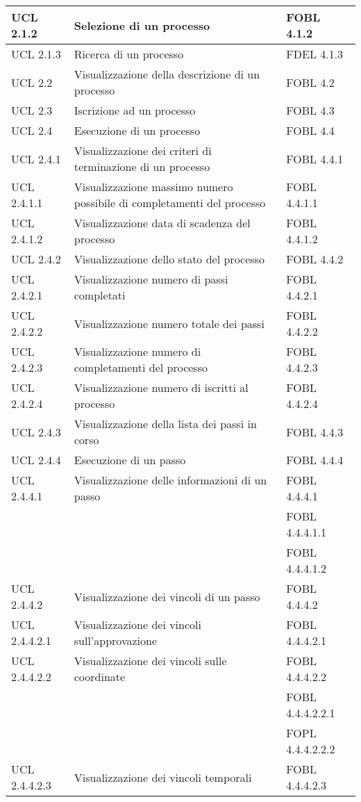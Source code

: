 \begin{longtable}{lXp{}}
\midrule 
UCL 2.1.2&Selezione di un processo&FOBL 4.1.2\\ 
\midrule 
UCL 2.1.3&Ricerca di un processo&FDEL 4.1.3\\ 
\midrule 
UCL 2.2&Visualizzazione della descrizione di un processo&FOBL 4.2\\ 
\midrule 
UCL 2.3&Iscrizione ad un processo&FOBL 4.3\\ 
\midrule 
UCL 2.4&Esecuzione di un processo&FOBL 4.4\\ 
\midrule 
UCL 2.4.1&Visualizzazione dei criteri di terminazione di un processo&FOBL 4.4.1\\
\midrule
UCL 2.4.1.1&Visualizzazione massimo numero possibile di completamenti del processo&FOBL 4.4.1.1\\ 
\midrule 
UCL 2.4.1.2&Visualizzazione data di scadenza del processo&FOBL 4.4.1.2\\ 
\midrule 
UCL 2.4.2&Visualizzazione dello stato del processo&FOBL 4.4.2\\ 
\midrule 
UCL 2.4.2.1&Visualizzazione numero di passi completati&FOBL 4.4.2.1\\ 
\midrule 
UCL 2.4.2.2&Visualizzazione numero totale dei passi&FOBL 4.4.2.2\\ 
\midrule 
UCL 2.4.2.3&Visualizzazione numero di completamenti del processo&FOBL 4.4.2.3\\ 
\midrule 
UCL 2.4.2.4&Visualizzazione numero di iscritti al processo&FOBL 4.4.2.4\\ 
\midrule 
UCL 2.4.3&Visualizzazione della lista dei passi in corso&FOBL 4.4.3\\ 
\midrule 
UCL 2.4.4&Esecuzione di un passo&FOBL 4.4.4\\ 
\midrule 
UCL 2.4.4.1&Visualizzazione delle informazioni di un passo&FOBL 4.4.4.1\\ 
&&FOBL 4.4.4.1.1\\
&&FOBL 4.4.4.1.2\\  
\midrule 
UCL 2.4.4.2&Visualizzazione dei vincoli di un passo&FOBL 4.4.4.2\\ 
\midrule 
UCL 2.4.4.2.1&Visualizzazione dei vincoli sull'approvazione&FOBL 4.4.4.2.1\\ 
\midrule 
UCL 2.4.4.2.2&Visualizzazione dei vincoli sulle coordinate&FOBL 4.4.4.2.2\\
&&FOBL 4.4.4.2.2.1\\
&&FOPL 4.4.4.2.2.2\\
\midrule 
UCL 2.4.4.2.3&Visualizzazione dei vincoli temporali&FOBL 4.4.4.2.3\\ 
\midrule 

\end{longtable}
